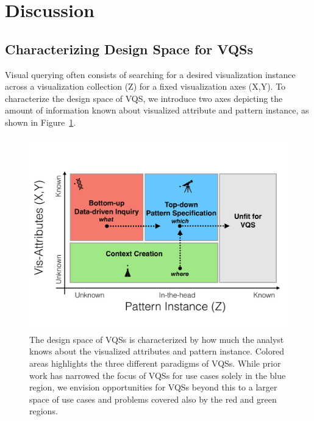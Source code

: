 \section{Discussion\label{sec:guidelines}}
\subsection{Characterizing Design Space for VQSs}
Visual querying often consists of searching for a desired visualization instance across a visualization collection (Z) for a fixed visualization axes (X,Y). To characterize the design space of VQS, we introduce two axes depicting the amount of information known about visualized attribute and pattern instance, as shown in Figure~\ref{2dmodel}.
\begin{figure}[h!]
  \centering
  \includegraphics[width=\linewidth]{figures/2dmodel.pdf}
  \caption{The design space of VQSs is characterized by how much the analyst knows about the visualized attributes and pattern instance. Colored areas highlights the three different paradigms of VQSs. While prior work has narrowed the focus of VQSs for use cases solely in the blue region, we envision opportunities for VQSs beyond this to a larger space of use cases and problems covered also by the red and green regions.}
  \label{2dmodel}
\end{figure}
